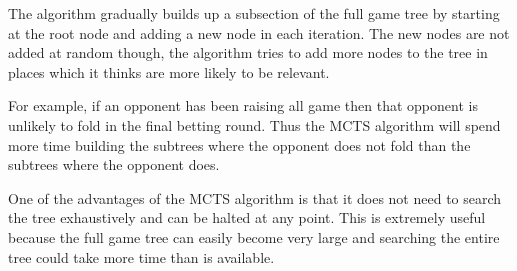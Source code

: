 
\label{sec:mcts-prep}


The \mcts algorithm gradually builds up a subsection of the full game tree by starting at the root node and adding a new node in each iteration. The new nodes are not added at random though, the algorithm tries to add more nodes to the tree in places which it thinks are more likely to be relevant.

For example, if an opponent has been raising all game then that opponent is unlikely to fold in the final betting round. Thus the MCTS algorithm will spend more time building the subtrees where the opponent does not fold than the subtrees where the opponent does. 


One of the advantages of the MCTS algorithm is that it does not need to search the tree exhaustively and can be halted at any point. This is extremely useful because the full game tree can easily become very large and searching the entire tree could take more time than is available. 




